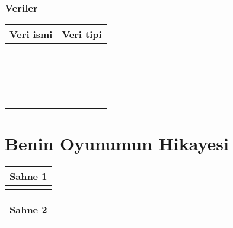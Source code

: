 \documentclass[12pt, a4paper]{article}
\begin{document}
\subsubsection*{Veriler}
\begin{tabular}{| p{4cm} | p{11cm} |  }
\hline			
Veri ismi&Veri tipi\\
\hline
& \\[2ex]
\hline  
& \\[2ex]
\hline  
& \\[2ex]
\hline  
& \\[2ex]
\hline  
& \\[2ex]
\hline  
& \\[2ex]
\hline  
& \\[2ex]
\hline  
& \\[2ex]
\hline  
& \\[2ex]
\hline  
& \\[2ex]
\hline  
& \\[2ex]
\hline  
& \\[2ex]
\hline  
& \\[2ex]
\hline  
& \\[2ex]
\hline  
& \\[2ex]
\hline  
& \\[2ex]
\hline  
& \\[2ex]
\hline  
& \\[2ex]
\hline  
\end{tabular}

\veriyapi{ }




\veriyapi{ }






\section*{Benin Oyunumun Hikayesi}

\noindent
\begin{tabular}{| p{16.5cm}  |  }
\hline			
Sahne 1\\
\hline
 \\[50ex]
\hline  
\end{tabular}

\vspace{5ex}
\noindent
\begin{tabular}{| p{16.5cm}  |  }
\hline			
Sahne 2\\
\hline
 \\[50ex]
\hline  
\end{tabular}
\end{document}
